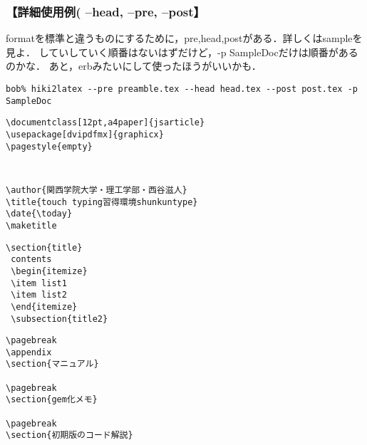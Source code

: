 \subsubsection{【詳細使用例( --head,  --pre,  --post】}
formatを標準と違うものにするために，pre,head,postがある．詳しくはsampleを見よ．
していしていく順番はないはずだけど，-p SampleDocだけは順番があるのかな．
あと，erbみたいにして使ったほうがいいかも．
\begin{lstlisting}[style=customCsh]
 bob% hiki2latex --pre preamble.tex --head head.tex --post post.tex -p SampleDoc 
\end{lstlisting}\begin{lstlisting}[style=customTeX]
%preamble.tex
\documentclass[12pt,a4paper]{jsarticle}
\usepackage[dvipdfmx]{graphicx}
\pagestyle{empty}
\end{lstlisting}\begin{lstlisting}[style=customTeX]
 
\end{lstlisting}\begin{lstlisting}[style=customTeX]
%head.tex
\author{関西学院大学・理工学部・西谷滋人}
\title{touch typing習得環境shunkuntype}
\date{\today}
\maketitle
\end{lstlisting}\begin{lstlisting}[style=customTeX]
 \section{title}
 contents
 \begin{itemize}
 \item list1
 \item list2
 \end{itemize}
 \subsection{title2}
\end{lstlisting}\begin{lstlisting}[style=customTeX]
%post.tex
\pagebreak
\appendix
\section{マニュアル}

\pagebreak
\section{gem化メモ}

\pagebreak
\section{初期版のコード解説}

\end{lstlisting}\begin{lstlisting}[style=customTeX]
 
\end{lstlisting}
